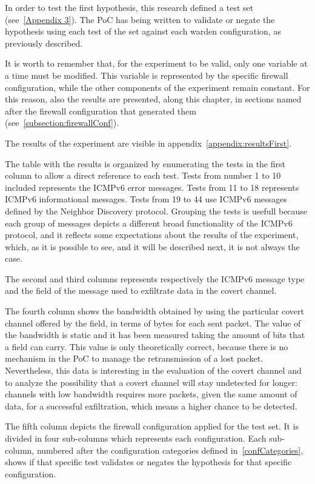 \documentclass[12pt]{article}
\begin{document}
In order to test the first hypothesis, this research defined a test set (see~\ref{Appendix 3}). The PoC has being written to validate or negate the hypothesis using each test of the set against each warden configuration, as previously described.

It is worth to remember that, for the experiment to be valid, only one variable at a time must be modified. This variable is represented by the specific firewall configuration, while the other components of the experiment remain constant. For this reason, also the results are presented, along this chapter, in sections named after the firewall configuration that generated them (see~\ref{subsection:firewallConf}).

The results of the experiment are visible in appendix~\ref{appendix:resultsFirst}.

The table with the results is organized by enumerating the tests in the first column to allow a direct reference to each test. Tests from number 1 to 10 included represents the ICMPv6 error messages. Tests from 11 to 18 represents ICMPv6 informational messages. Tests from 19 to 44 use ICMPv6 messages defined by the Neighbor Discovery protocol. Grouping the tests is usefull because each group of messages depicts a different broad functionality of the ICMPv6 protocol, and it reflects some expectations about the results of the experiment, which, as it is possible to see, and it will be described next, it is not always the case.

The second and third columns represents respectively the ICMPv6 message type and the field of the message used to exfiltrate data in the covert channel.

The fourth column shows the bandwidth obtained by using the particular covert channel offered by the field, in terms of bytes for each sent packet. The value of the bandwidth is static and it has been measured taking the amount of bits that a field can carry. This value is only theoretically correct, because there is no mechanism in the PoC to manage the retransmission of a lost packet. Nevertheless, this data is interesting in the evaluation of the covert channel and to analyze the possibility that a covert channel will stay undetected for longer: channels with low bandwidth requires more packets, given the same amount of data, for a successful exfiltration, which means a higher chance to be detected.

The fifth column depicts the firewall configuration applied for the test set. It is divided in four sub-columns which represents each configuration. Each sub-column, numbered after the configuration categories defined in~\ref{confCategories}, shows if that specific test validates or negates the hypothesis for that specific configuration.
\end{document}
